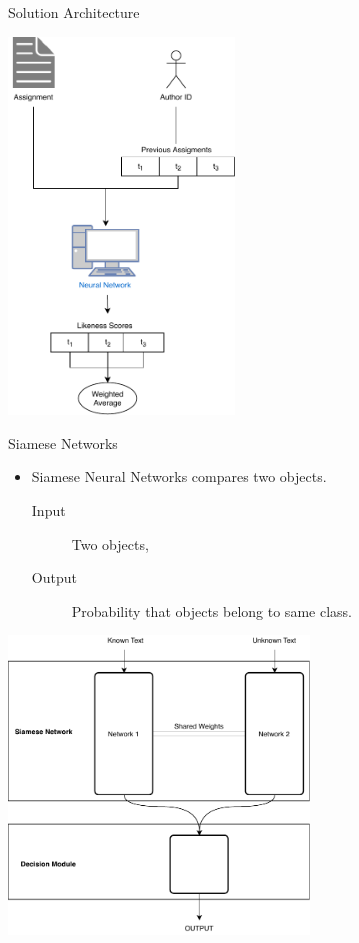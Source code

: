 \documentclass[10pt]{beamer}
\begin{document}
\begin{frame}[fragile]{Solution Architecture}
    \begin{center}
        \includegraphics[width=0.45\textwidth]{../../macom/pictures/Model}
    \end{center}
\end{frame}

\begin{frame}[fragile]{Siamese Networks}
    \begin{itemize}
        \item Siamese Neural Networks compares two objects.

            \begin{description}
                \item[Input] Two objects,
                \item[Output] Probability that objects belong to same class.
            \end{description}
    \end{itemize}

    \begin{center}
        \includegraphics[width=0.6\textwidth]{../../report/pictures/method/siamese}
    \end{center}
\end{frame}
\end{document}
